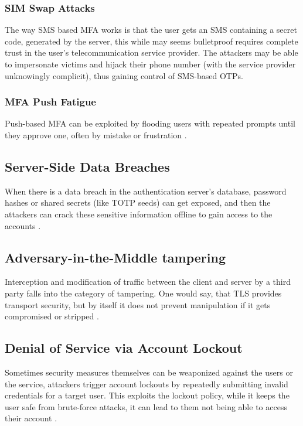 \subsubsection{SIM Swap Attacks}
The way SMS based MFA works is that the user gets an SMS containing a secret code, generated by the server, this while may seems bulletproof requires complete trust in the user's telecommunication service provider. The attackers may be able to impersonate victims and hijack their phone number (with the service provider unknowingly complicit), thus gaining control of SMS-based OTPs\cite{Lee2020SIMswap}.


\subsubsection{MFA Push Fatigue}
Push-based MFA can be exploited by flooding users with repeated prompts until they approve one, often by mistake or frustration \cite{CISA2023PhishingResistantMFA}.

\subsection{Server-Side Data Breaches}
When there is a data breach in the authentication server's database, password hashes or shared secrets (like TOTP seeds) can get exposed, and then the attackers can crack these sensitive information offline to gain access to the accounts \cite{OWASPPasswordStorage}.

\subsection{Adversary-in-the-Middle tampering}
Interception and modification of traffic between the client and server by a third party falls into the category of tampering. One would say, that TLS provides transport security, but by itself it does not prevent manipulation if it gets compromised or stripped \cite{OWASPMitM}.

\subsection{Denial of Service via Account Lockout}
Sometimes security measures themselves can be weaponized against the users or the service, attackers trigger account lockouts by repeatedly submitting invalid credentials for a target user. This exploits the lockout policy, while it keeps the user safe from brute-force attacks, it can lead to them not being able to access their account \cite{NISTSP80063B}.